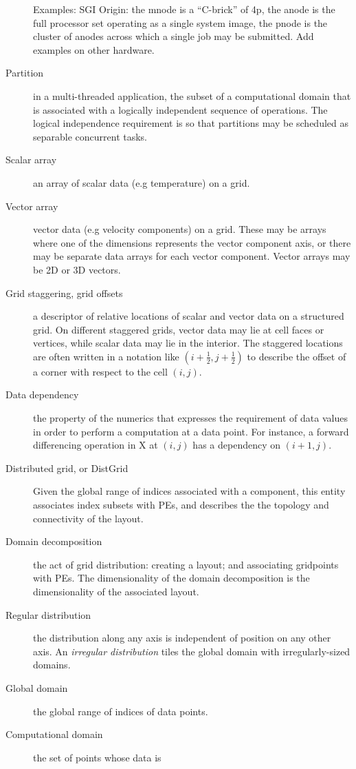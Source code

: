 \begin{description}
  Examples: SGI Origin: the mnode is a ``C-brick'' of 4p, the anode is
  the full processor set operating as a single system image, the pnode
  is the cluster of anodes across which a single job may be
  submitted. Add examples on other hardware.
\item[Partition] in a multi-threaded application, the subset of a
  computational domain that is associated with a logically independent
  sequence of operations. The logical independence requirement is so
  that partitions may be scheduled as separable concurrent tasks.
\item[Scalar array] an array of scalar data (e.g temperature) on a
  grid.
\item[Vector array] vector data (e.g velocity components) on a
  grid. These may be arrays where one of the dimensions represents the
  vector component axis, or there may be separate data arrays for each
  vector component. Vector arrays may be 2D or 3D vectors.
\item[Grid staggering, grid offsets] a descriptor of relative locations
  of scalar and vector data on a structured grid. On different
  staggered grids, vector data may lie at cell faces or vertices,
  while scalar data may lie in the interior. The staggered locations
  are often written in a notation like $(i+\frac12,j+\frac12)$ to
  describe the offset of a corner with respect to the cell $(i,j)$.
\item[Data dependency] the property of the numerics that expresses the
  requirement of data values in order to perform a
  computation at a data point. For instance, a forward differencing
  operation in X at $(i,j)$ has a dependency on $(i+1,j)$.
\item[Distributed grid, or DistGrid] Given the global range of indices
  associated with a component, this entity associates index subsets
  with PEs, and describes the the topology and connectivity of the
  layout.
\item[Domain decomposition] the act of grid distribution: creating a
  layout; and associating gridpoints with PEs. The dimensionality
  of the domain decomposition is the dimensionality of the associated
  layout.
\item[Regular distribution] the distribution along any axis is
  independent of position on any other axis. An \emph{irregular
    distribution} tiles the global domain with irregularly-sized
  domains.
\item[Global domain] the global range of indices of data points.
\item[Computational domain] the set of points whose data is

\end{description}

